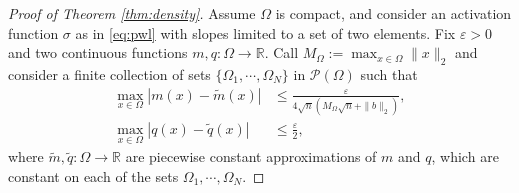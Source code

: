 \documentclass[10pt,a4paper]{amsart}
\newcommand{\R}{\mathbb{R}}
\begin{document}
\begin{proof}[Proof of Theorem \ref{thm:density}]
Assume $\Omega$ is compact, and consider an activation function $\sigma$ as in \eqref{eq:pwl} with slopes limited to a set of two elements. %
Fix $\varepsilon>0$ and two continuous functions $m,q:\Omega\to\mathbb{R}$. Call $M_{\Omega}:=\max_{x\in\Omega}\|x\|_2$ and consider a finite collection of sets $\{\Omega_1,\cdots,\Omega_N\}$ in $\mathcal{P}(\Omega)$ such that
\[
\begin{aligned}
\max_{x\in\Omega}|m(x) - \widetilde{m}(x)| &\leq \frac{\varepsilon}{4\sqrt{n}(M_{\Omega}\sqrt{n}+\|b\|_2)},\\
\max_{x\in\Omega}|q(x) - \widetilde{q}(x)| &\leq \frac{\varepsilon}{2},
\end{aligned}
\]
where $\widetilde{m},\widetilde{q}:\Omega\to\mathbb{R}$ are piecewise constant approximations of $m$ and $q$, which are constant on each of the sets $\Omega_1,\cdots,\Omega_N$.


\end{proof}
\end{document}
